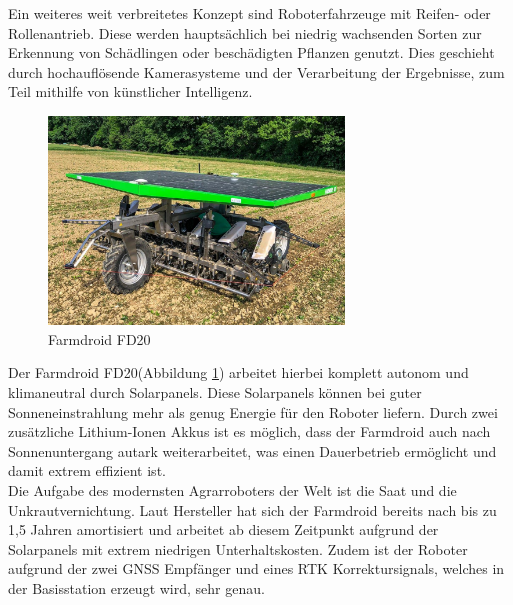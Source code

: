 Ein weiteres weit verbreitetes Konzept sind Roboterfahrzeuge mit Reifen- oder
Rollenantrieb. Diese werden hauptsächlich bei niedrig wachsenden Sorten zur
Erkennung von Schädlingen oder beschädigten Pflanzen genutzt. Dies geschieht
durch hochauflösende Kamerasysteme und der Verarbeitung der Ergebnisse, zum
Teil mithilfe von künstlicher Intelligenz.

\begin{figure}[h]
	\centering
	\includegraphics[width=0.7\textwidth]{bilder/farmdroid_fd20.png}
	\caption[Farmdroid FD20]{Farmdroid FD20\cite{Wurst}}
	\label{fig:farmdroid_fd20}
\end{figure}

Der Farmdroid FD20(Abbildung \ref{fig:farmdroid_fd20}) arbeitet hierbei komplett autonom und klimaneutral durch
Solarpanels. Diese Solarpanels können bei guter Sonneneinstrahlung mehr als
genug Energie für den Roboter liefern. Durch zwei zusätzliche Lithium-Ionen
Akkus ist es möglich, dass der Farmdroid auch nach Sonnenuntergang autark
weiterarbeitet, was einen Dauerbetrieb ermöglicht und damit extrem effizient
ist.\cite{jungwirth2022arbeitszeitbedarf}\\ Die Aufgabe des modernsten
Agrarroboters der Welt\cite{donaukurier2022} ist die Saat und die
Unkrautvernichtung. Laut Hersteller hat sich der Farmdroid bereits nach bis zu
1,5 Jahren amortisiert und arbeitet ab diesem Zeitpunkt aufgrund der
Solarpanels mit extrem niedrigen Unterhaltskosten. Zudem ist der Roboter
aufgrund der zwei GNSS Empfänger und eines RTK Korrektursignals, welches in der
Basisstation erzeugt wird, sehr genau.\cite{jungwirth2022arbeitszeitbedarf}\cite{spykman2023wirtschaftlichkeitsbewertung}